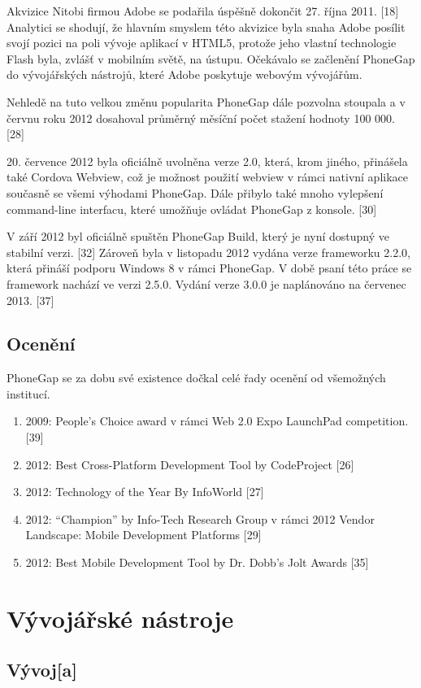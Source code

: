 Akvizice Nitobi firmou Adobe se podařila úspěšně dokončit 27. října 2011. [18] Analytici se shodují, že hlavním smyslem této akvizice byla snaha Adobe posílit svojí pozici na poli vývoje aplikací v HTML5, protože jeho vlastní technologie Flash byla, zvlášť v mobilním světě, na ústupu. Očekávalo se začlenění PhoneGap do vývojářských nástrojů, které Adobe poskytuje webovým vývojářům.

Nehledě na tuto velkou změnu popularita PhoneGap dále pozvolna stoupala a v červnu roku 2012 dosahoval průměrný měsíční počet stažení hodnoty 100 000. [28]

20. července 2012 byla oficiálně uvolněna verze 2.0, která, krom jiného, přinášela také Cordova Webview, což je možnost použití webview v rámci nativní aplikace současně se všemi výhodami PhoneGap. Dále přibylo také mnoho vylepšení command-line interfacu, které umožňuje ovládat PhoneGap z konsole. [30]

V září 2012 byl oficiálně spuštěn PhoneGap Build, který je nyní dostupný ve stabilní verzi. [32] Zároveň byla v listopadu 2012 vydána verze frameworku 2.2.0, která přináší podporu Windows 8 v rámci PhoneGap. V době psaní této práce se framework nachází ve verzi 2.5.0. Vydání verze 3.0.0 je naplánováno na červenec 2013. [37]

\subsection{Ocenění}
PhoneGap se za dobu své existence dočkal celé řady ocenění od všemožných institucí.

\begin{enumerate}
  \item 2009: People’s Choice award v rámci Web 2.0 Expo LaunchPad competition. [39]
  \item 2012: Best Cross-Platform Development Tool by CodeProject [26]
  \item 2012: Technology of the Year By InfoWorld [27]
  \item 2012: “Champion” by Info-Tech Research Group v rámci 2012 Vendor Landscape: Mobile Development Platforms [29]
  \item 2012: Best Mobile Development Tool by Dr. Dobb's Jolt Awards [35]
\end{enumerate}

\section{Vývojářské nástroje}
\subsection{Vývoj[a]}

